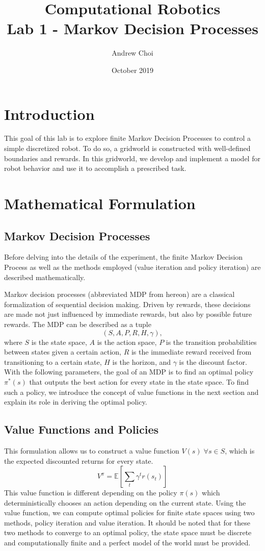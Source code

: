 \documentclass[fullpage]{article}
\title{\textbf{Computational Robotics} \\ \large Lab 1 - Markov Decision Processes}
\author{Andrew Choi}
\date{October 2019}
\begin{document}
\maketitle

\section{Introduction}

This goal of this lab is to explore finite Markov Decision Processes to control a simple discretized robot. To do so, a gridworld is constructed with well-defined boundaries and rewards. In this gridworld, we develop and implement a model for robot behavior and use it to accomplish a prescribed task.

\section{Mathematical Formulation}

\subsection{Markov Decision Processes}
Before delving into the details of the experiment, the finite Markov Decision Process as well as the methods employed (value iteration and policy iteration) are described mathematically.

Markov decision processes (abbreviated MDP from hereon) are a classical formalization of sequential decision making. Driven by rewards, these decisions are made not just influenced by immediate rewards, but also by possible future rewards. The MDP can be described as a tuple
\[
(S, A, P, R, H, \gamma),
\]
where $S$ is the state space, $A$ is the action space, $P$ is the transition probabilities between states given a certain action, $R$ is the immediate reward received from transitioning to a certain state, $H$ is the horizon, and $\gamma$ is the discount factor. With the following parameters, the goal of an MDP is to find an optimal policy $\pi^*(s)$ that outputs the best action for every state in the state space. To find such a policy, we introduce the concept of value functions in the next section and explain its role in deriving the optimal policy.  

\subsection{Value Functions and Policies}
This formulation allows us to construct a value function $V(s) \; \forall s \in S$, which is the expected discounted returns for every state.
\[
V^\pi = \mathbb{E}[\sum_t \gamma^t r(s_t)]
\]
This value function is different depending on the policy $\pi(s)$ which deterministically chooses an action depending on the current state. Using the value function, we can compute optimal policies for finite state spaces using two methods, policy iteration and value iteration. It should be noted that for these two methods to converge to an optimal policy, the state space must be discrete and computationally finite and a perfect model of the world must be provided.
\end{document}
